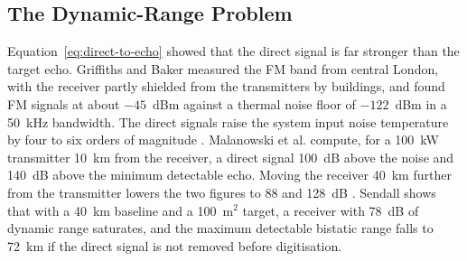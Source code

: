 \subsection{The Dynamic-Range Problem}
\label{subsec:ch2.pbr.dynamicrange}
Equation~\ref{eq:direct-to-echo} showed that the direct signal is far stronger than the target echo. Griffiths and Baker \citep{griffiths2007} measured the FM band from central London, with the receiver partly shielded from the transmitters by buildings, and found FM signals at about $-45$~dBm against a thermal noise floor of $-122$~dBm in a 50~kHz bandwidth. The direct signals raise the system input noise temperature by four to six orders of magnitude \citep{griffiths2007}. Malanowski et al. \citep{malanowski2014} compute, for a 100~kW transmitter 10~km from the receiver, a direct signal 100~dB above the noise and 140~dB above the minimum detectable echo. Moving the receiver 40~km further from the transmitter lowers the two figures to 88 and 128~dB \citep{malanowski2014}. Sendall \citep{sendall2016} shows that with a 40~km baseline and a 100~m$^2$ target, a receiver with 78~dB of dynamic range saturates, and the maximum detectable bistatic range falls to 72~km if the direct signal is not removed before digitisation.

